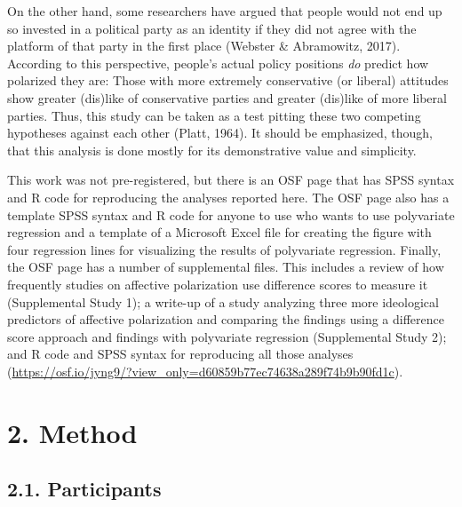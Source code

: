 \documentclass[authordate, meta, issue]{jote-new-article}
\begin{document}
	On the other hand, some researchers have argued that people would not end up so invested in a political party as an identity if they did not agree with the platform of that party in the first place (Webster \& Abramowitz, 2017). According to this perspective, people's actual policy positions \emph{do }predict how polarized they are: Those with more extremely conservative (or liberal) attitudes show greater (dis)like of conservative parties and greater (dis)like of more liberal parties. Thus, this study can be taken as a test pitting these two competing hypotheses against each other (Platt, 1964). It should be emphasized, though, that this analysis is done mostly for its demonstrative value and simplicity.



	This work was not pre-registered, but there is an OSF page that has SPSS syntax and R code for reproducing the analyses reported here. The OSF page also has a template SPSS syntax and R code for anyone to use who wants to use polyvariate regression and a template of a Microsoft Excel file for creating the figure with four regression lines for visualizing the results of polyvariate regression. Finally, the OSF page has a number of supplemental files. This includes a review of how frequently studies on affective polarization use difference scores to measure it (Supplemental Study 1); a write-up of a study analyzing three more ideological predictors of affective polarization and comparing the findings using a difference score approach and findings with polyvariate regression (Supplemental Study 2); and R code and SPSS syntax for reproducing all those analyses (\url{https://osf.io/jyng9/?view_only=d60859b77ec74638a289f74b9b90fd1c}).











	\section{2. Method}



	\subsection{2.1. Participants}
\end{document}
